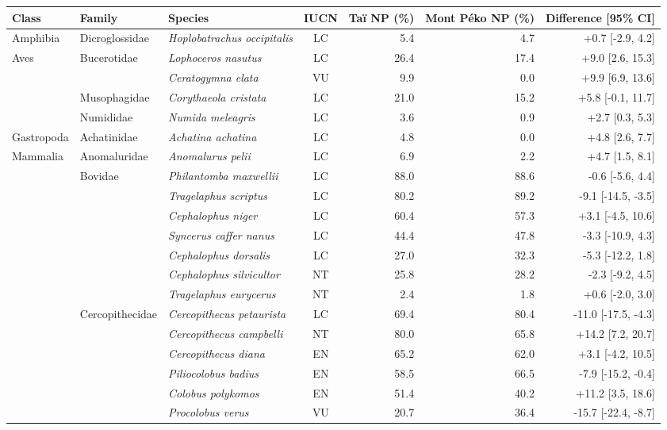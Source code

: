 \begin{tabular}{lllcrrr}
\toprule
Class & Family & Species & IUCN & Taï NP (\%) & Mont Péko NP (\%) & Difference [95\% CI] \\
\midrule
Amphibia & Dicroglossidae & \textit{Hoplobatrachus occipitalis} & LC & 5.4 & 4.7 & +0.7 [-2.9, 4.2] \\
Aves & Bucerotidae & \textit{Lophoceros nasutus} & LC & 26.4 & 17.4 & +9.0 [2.6, 15.3] \\
 &  & \textit{Ceratogymna elata} & VU & 9.9 & 0.0 & +9.9 [6.9, 13.6] \\
 & Musophagidae & \textit{Corythaeola cristata} & LC & 21.0 & 15.2 & +5.8 [-0.1, 11.7] \\
 & Numididae & \textit{Numida meleagris} & LC & 3.6 & 0.9 & +2.7 [0.3, 5.3] \\
Gastropoda & Achatinidae & \textit{Achatina achatina} & LC & 4.8 & 0.0 & +4.8 [2.6, 7.7] \\
Mammalia & Anomaluridae & \textit{Anomalurus pelii} & LC & 6.9 & 2.2 & +4.7 [1.5, 8.1] \\
 & Bovidae & \textit{Philantomba maxwellii} & LC & 88.0 & 88.6 & -0.6 [-5.6, 4.4] \\
 &  & \textit{Tragelaphus scriptus} & LC & 80.2 & 89.2 & -9.1 [-14.5, -3.5] \\
 &  & \textit{Cephalophus niger} & LC & 60.4 & 57.3 & +3.1 [-4.5, 10.6] \\
 &  & \textit{Syncerus caffer nanus} & LC & 44.4 & 47.8 & -3.3 [-10.9, 4.3] \\
 &  & \textit{Cephalophus dorsalis} & LC & 27.0 & 32.3 & -5.3 [-12.2, 1.8] \\
 &  & \textit{Cephalophus silvicultor} & NT & 25.8 & 28.2 & -2.3 [-9.2, 4.5] \\
 &  & \textit{Tragelaphus eurycerus} & NT & 2.4 & 1.8 & +0.6 [-2.0, 3.0] \\
 & Cercopithecidae & \textit{Cercopithecus petaurista} & LC & 69.4 & 80.4 & -11.0 [-17.5, -4.3] \\
 &  & \textit{Cercopithecus campbelli} & NT & 80.0 & 65.8 & +14.2 [7.2, 20.7] \\
 &  & \textit{Cercopithecus diana} & EN & 65.2 & 62.0 & +3.1 [-4.2, 10.5] \\
 &  & \textit{Piliocolobus badius} & EN & 58.5 & 66.5 & -7.9 [-15.2, -0.4] \\
 &  & \textit{Colobus polykomos} & EN & 51.4 & 40.2 & +11.2 [3.5, 18.6] \\
 &  & \textit{Procolobus verus} & VU & 20.7 & 36.4 & -15.7 [-22.4, -8.7] \\

\end{tabular}
